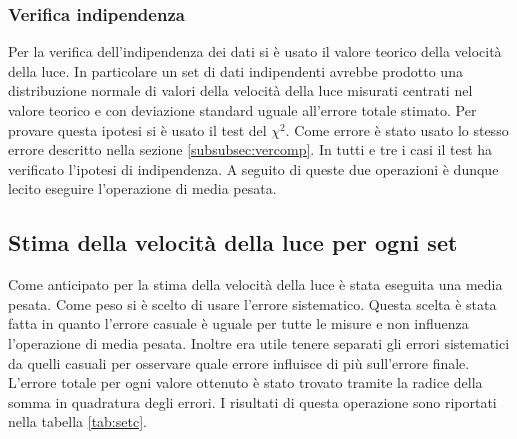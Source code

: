 \documentclass[a4paper,11pt]{article}
\begin{document}
	\subsubsection{Verifica indipendenza}
	Per la verifica dell'indipendenza dei dati si è usato il valore teorico della velocità della luce. In particolare un set di dati indipendenti avrebbe prodotto una distribuzione normale di valori della velocità della luce misurati centrati nel valore teorico e con deviazione standard uguale all'errore totale stimato. Per provare questa ipotesi si è usato il test del $ \chi^2 $. Come errore è stato usato lo stesso errore descritto nella sezione \ref{subsubsec:vercomp}. In tutti e tre i casi il test ha verificato l'ipotesi di indipendenza. A seguito di queste due operazioni è dunque lecito eseguire l'operazione di media pesata.
	\subsection{Stima della velocità della luce per ogni set}
	Come anticipato per la stima della velocità della luce è stata eseguita una media pesata. Come peso si è scelto di usare l'errore sistematico. Questa scelta è stata fatta in quanto l'errore casuale è uguale per tutte le misure e non influenza l'operazione di media pesata. Inoltre era utile tenere separati gli errori sistematici da quelli casuali per osservare quale errore influisce di più sull'errore finale. L'errore totale per ogni valore ottenuto è stato trovato tramite la radice della somma in quadratura degli errori. I risultati di questa operazione sono riportati nella tabella \ref{tab:setc}.
\end{document}

